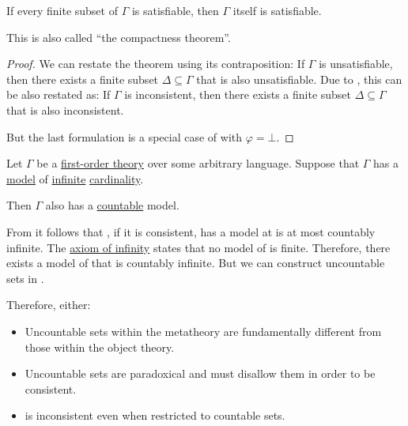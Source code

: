 \begin{corollary}\label{thm:first_order_compactness_theorem_satisfiability}
  If every finite subset of \( \Gamma \) is satisfiable, then \( \Gamma \) itself is satisfiable.

  This is also called \enquote{the compactness theorem}.
\end{corollary}
\begin{proof}
  We can restate the theorem using its contraposition: If \( \Gamma \) is unsatisfiable, then there exists a finite subset \( \Delta \subseteq \Gamma \) that is also unsatisfiable. Due to , this can be also restated as: If \( \Gamma \) is inconsistent, then there exists a finite subset \( \Delta \subseteq \Gamma \) that is also inconsistent.

  But the last formulation is a special case of  with \( \varphi = \bot \).
\end{proof}

\begin{theorem}\label{thm:downward_lowenheim_skolem_theorem}
  Let \( \Gamma \) be a \hyperref[def:first_order_theory]{first-order theory} over some arbitrary language. Suppose that \( \Gamma \) has a \hyperref[def:first_order_semantics/satisfiability]{model} of \hyperref[def:set_finiteness]{infinite} \hyperref[thm:cardinality_existence]{cardinality}.

  Then \( \Gamma \) also has a \hyperref[def:set_countability]{countable} model.
\end{theorem}

\begin{example}\label{ex:skolems_paradox}
  From  it follows that \hyperref[def:zfc]{}, if it is consistent, has a model at is at most countably infinite. The \hyperref[def:zfc/infinity]{axiom of infinity} states that no model of  is finite. Therefore, there exists a model of  that is countably infinite. But we can construct uncountable sets in .

  Therefore, either:
  \begin{itemize}
    \item Uncountable sets within the metatheory are fundamentally different from those within the object theory.
    \item Uncountable sets are paradoxical and  must disallow them in order to be consistent.
    \item {} is inconsistent even when restricted to countable sets.
  \end{itemize}
\end{example}

